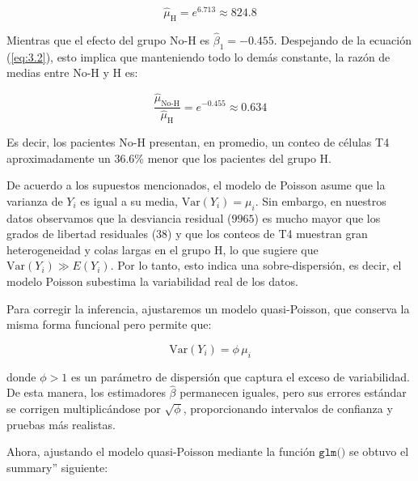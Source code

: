 \begin{equation*}
    \widehat{\mu}_{\text{H}} = e^{6.713} \approx 824.8
\end{equation*}

Mientras que el efecto del grupo No-H es $\widehat{\beta}_1 = -0.455$. Despejando de la ecuación (\ref{eq:3.2}), esto implica que manteniendo todo lo demás constante, la razón de medias entre No-H y H es:

\begin{equation*}
    \frac{\widehat{\mu}_{\text{No-H}}}{\widehat{\mu}_{\text{H}}} = e^{-0.455} \approx 0.634
\end{equation*}

Es decir, los pacientes No-H presentan, en promedio, un conteo de células T4 aproximadamente un 36.6\% menor que los pacientes del grupo H. 

De acuerdo a los supuestos mencionados, el modelo de Poisson asume que la varianza de $Y_i$ es igual a su media, $\mathrm{Var}(Y_i)=\mu_i$. Sin embargo, en nuestros datos observamos que la desviancia residual ($9965$) es mucho mayor que los grados de libertad residuales ($38$) y que los conteos de T4 muestran gran heterogeneidad y colas largas en el grupo H, lo que sugiere que $\mathrm{Var}(Y_i) \gg E(Y_i)$. Por lo tanto, esto indica una sobre-dispersión, es decir, el modelo Poisson subestima la variabilidad real de los datos.

Para corregir la inferencia, ajustaremos un modelo quasi-Poisson, que conserva la misma forma funcional pero permite que:

\begin{equation*}
    \mathrm{Var}(Y_i) = \phi \, \mu_i
\end{equation*}

donde $\phi > 1$ es un parámetro de dispersión que captura el exceso de variabilidad. De esta manera, los estimadores $\widehat{\beta}$ permanecen iguales, pero sus errores estándar se corrigen multiplicándose por $\sqrt{\phi}$, proporcionando intervalos de confianza y pruebas más realistas.

Ahora, ajustando el modelo quasi-Poisson mediante la función $\texttt{glm()}$ se obtuvo el summary'' siguiente:

